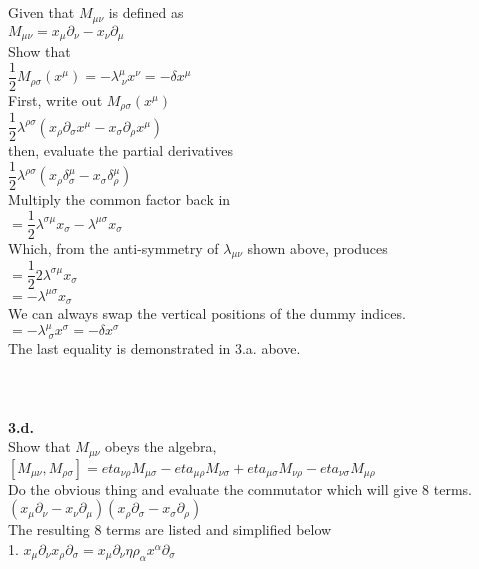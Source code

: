 \documentclass[prb,preprint]
{revtex4-1}
\newcommand{\PRLsep}{\noindent\makebox[\linewidth]{\resizebox{0.8888\linewidth}{2pt}{$\bullet$}}\bigskip}
\begin{document}
\\
\\
Given that $M_{\mu\nu}$ is defined as 
\\
$M_{\mu\nu} = x_\mu\partial_\nu - x_\nu\partial_\mu$
\\
Show that 
\\
$\dfrac{1}{2} M_{\rho\sigma}\left(x^\mu\right) = -\lambda^\mu_{\;\nu} x^\nu = -\delta x^\mu$
\\
First, write out $M_{\rho\sigma}\left(x^\mu\right)$
\\
$\dfrac{1}{2}\lambda^{\rho\sigma}\left(x_\rho \partial_\sigma x^\mu - x_\sigma \partial_\rho x^\mu\right)$
\\
then, evaluate the partial derivatives
\\
$\dfrac{1}{2}\lambda^{\rho\sigma}\left(x_\rho \delta^\mu_\sigma - x_\sigma \delta^\mu_\rho\right)$
\\
Multiply the common factor back in
\\
$= \dfrac{1}{2}\lambda^{\sigma\mu}x_\sigma - \lambda^{\mu\sigma}x_\sigma$
\\
Which, from the anti-symmetry of $\lambda_{\mu\nu}$ shown above, produces
\\
$=\dfrac{1}{2}2\lambda^{\sigma\mu} x_\sigma$
\\
$=-\lambda^{\mu\sigma} x_\sigma$
\\
We can always swap the vertical positions of the dummy indices.
\\
$=-\lambda^\mu_{\;\sigma} x^\sigma = -\delta x^\sigma$
\\
The last equality is demonstrated in 3.a. above.
\\
\\
\PRLsep
\\
\\
\newpage
\textbf{3.d.}
\\
Show that $M_{\mu\nu}$ obeys the algebra, 
$\left[M_{\mu\nu}, M_{\rho\sigma}\right] = eta_{\nu\rho}M_{\mu\sigma} - eta_{\mu\rho}M_{\nu\sigma} + eta_{\mu\sigma}M_{\nu\rho} - eta_{\nu\sigma}M_{\mu\rho}$
\\
Do the obvious thing and evaluate the commutator which will give 8 terms.
\\
$\left(x_\mu \partial_\nu - x_\nu \partial_\mu\right)\left(x_\rho \partial_\sigma - x_\sigma \partial_\rho\right)$
\\
The resulting 8 terms are listed and simplified below
\\
1.  $x_\mu \partial_\nu x_\rho \partial_\sigma = x_\mu\partial_\nu\eta{\rho_\alpha}x^\alpha \partial_\sigma$
\end{document}
